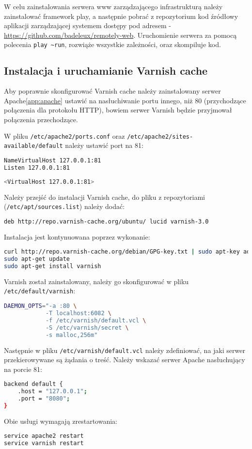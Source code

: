 W celu zainstalowania serwera www zarządzającego infrastrukturą należy zainstalować framework play, a następnie pobrać z repozytorium kod źródłowy aplikacji zarządzającej systemem dostępy pod adresem - \url{https://github.com/badeleux/remotely-web}. Uruchomienie serwera za pomocą polecenia \lstinline|play ~run|, rozwiąże wszystkie zależności, oraz skompiluje kod. 

\subsection{Instalacja i uruchamianie Varnish cache}

Aby poprawnie skonfigurować Varnish cache należy zainstalowany serwer Apache\ref{app:apache} ustawić na nasłuchiwanie portu innego, niż 80 (przychodzące połączenia dla protokołu HTTP), bowiem serwer Varnish będzie przyjmował połączenia przechodzące.

W pliku \lstinline{/etc/apache2/ports.conf} oraz \lstinline{/etc/apache2/sites-available/default} należy ustawić port na 81:
\begin{lstlisting}[language=bash]
NameVirtualHost 127.0.0.1:81
Listen 127.0.0.1:81
\end{lstlisting}

\begin{lstlisting}[language=bash]
<VirtualHost 127.0.0.1:81>
\end{lstlisting}

Należy przejść do instalacji Varnish cache, do pliku z repozytoriami (\lstinline{/etc/apt/sources.list}) należy dodać:
\begin{lstlisting}[language=bash]
deb http://repo.varnish-cache.org/ubuntu/ lucid varnish-3.0
\end{lstlisting}

Instalacja jest kontynuowana poprzez wykonanie:
\begin{lstlisting}[language=bash]
curl http://repo.varnish-cache.org/debian/GPG-key.txt | sudo apt-key add -
sudo apt-get update
sudo apt-get install varnish
\end{lstlisting}

Varnish został zainstalowany, należy go skonfigurować w pliku \lstinline{/etc/default/varnish}:

\begin{lstlisting}[language=bash]
DAEMON_OPTS="-a :80 \
            -T localhost:6082 \
            -f /etc/varnish/default.vcl \
            -S /etc/varnish/secret \
            -s malloc,256m"
\end{lstlisting}

Następnie w pliku \lstinline{/etc/varnish/default.vcl} należy zdefiniować, na jaki serwer przekierowywane są żądania o treść. Należy wskazać serwer Apache nasłuchujący na porcie 81:

\begin{lstlisting}[language=bash]
backend default {
    .host = "127.0.0.1";
    .port = "8080";
}
\end{lstlisting}

Obie usługi wymagają zrestartowania:

\begin{lstlisting}[language=bash]
service apache2 restart
service varnish restart
\end{lstlisting}
